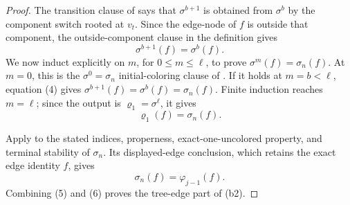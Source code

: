 \begin{proof}
The transition clause of  says
that \(\sigma^{b+1}\) is obtained from \(\sigma^b\) by the component
switch rooted at \(v_t\).  Since the edge-node of \(f\) is outside
that component, the outside-component clause in the definition
 gives
\[
                         \sigma^{b+1}(f)=\sigma^b(f).          \tag{4}
\]
We now induct explicitly on \(m\), for \(0\leq m\leq\ell\), to prove
\(\sigma^m(f)=\sigma_n(f)\).  At \(m=0\), this is the
\(\sigma^0=\sigma_n\) initial-coloring clause of
.  If it holds at
\(m=b<\ell\), equation (4) gives
\(\sigma^{b+1}(f)=\sigma^b(f)=\sigma_n(f)\).  Finite induction reaches
\(m=\ell\); since the output is \(\varrho_1=\sigma^\ell\), it gives
\[
                         \varrho_1(f)=\sigma_n(f).              \tag{5}
\]

Apply  to the stated indices,
properness, exact-one-uncolored property, and terminal stability of
\(\sigma_n\).  Its displayed-edge conclusion, which retains the exact
edge identity \(f\), gives
\[
                         \sigma_n(f)=\varphi_{j-1}(f).          \tag{6}
\]
Combining (5) and (6) proves the tree-edge part of (b2).
\end{proof}
